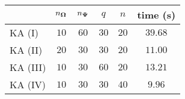 \centering
\renewcommand{\arraystretch}{1.2}
\begin{tabular}{@{}lccccc@{}}
\toprule
 & $n_{\boldsymbol{\Omega}}$ & $n_{\boldsymbol{\Psi}}$ & $q$ & $n$ & time (s)\\
\midrule
KA (I) & $10$ & $60$ & $30$ & $20$ & $39.68$ \\
KA (II) & $20$ & $30$ & $30$ & $20$ & $11.00$ \\
KA (III) & $10$ & $30$ & $60$ & $20$ & $13.21$ \\
KA (IV) & $10$ & $30$ & $30$ & $40$ & $9.96$ \\
\bottomrule
\end{tabular}
